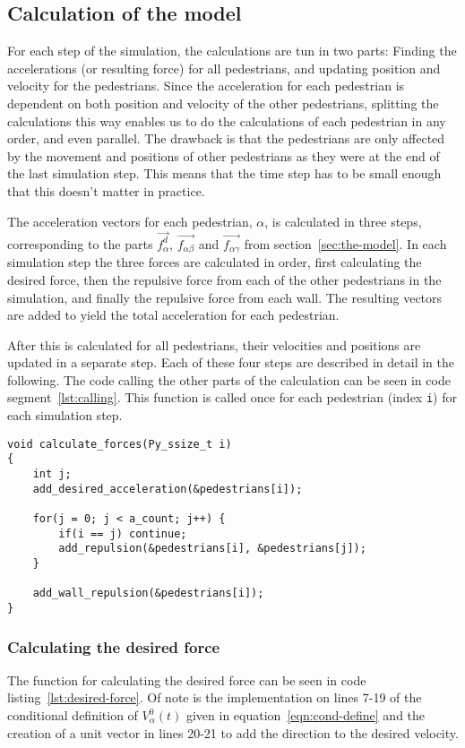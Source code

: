 \subsection{Calculation of the model}
\label{sec:model-calculation}
For each step of the simulation, the calculations are tun in two parts: 
Finding the accelerations (or resulting force) for all pedestrians, and updating 
position and velocity for the pedestrians.  Since the acceleration for each pedestrian 
is dependent on both position and velocity of the other pedestrians, splitting the 
calculations this way enables us to do the calculations of each pedestrian in any 
order, and even parallel. The drawback is that the pedestrians are only affected by 
the movement and positions of other pedestrians as they were at the end of the last 
simulation step. This means that the time step has to be small enough that 
this doesn't matter in practice.

The acceleration vectors for each pedestrian, $\alpha$, is calculated in three 
steps, corresponding to the parts $\overrightarrow{f_\alpha^d}$, 
$\overrightarrow{f_{\alpha \beta}}$ and $\overrightarrow{f_{\alpha \gamma}}$ from 
section~\ref{sec:the-model}. In each simulation step the three forces are 
calculated in order, first calculating the desired force, then the repulsive 
force from each of the other pedestrians in the simulation, and finally the 
repulsive force from each wall. The resulting vectors are added to yield the 
total acceleration for each pedestrian.

After this is calculated for all pedestrians, their velocities and positions are 
updated in a separate step. Each of these four steps are described in detail 
in the following. The code calling the other parts of the calculation can be 
seen in code segment~\ref{lst:calling}. This function is called once for each 
pedestrian (index \texttt{i}) for each simulation step.

\begin{lstlisting}[caption={Main function calling the other parts of the 
    calculation code.},label=lst:calling]
void calculate_forces(Py_ssize_t i)
{
    int j;
    add_desired_acceleration(&pedestrians[i]);

    for(j = 0; j < a_count; j++) {
        if(i == j) continue;
        add_repulsion(&pedestrians[i], &pedestrians[j]);
    }

    add_wall_repulsion(&pedestrians[i]);
}
\end{lstlisting}

\subsubsection{Calculating the desired force}
The function for calculating the desired force can be seen in code 
listing~\ref{lst:desired-force}. Of note is the implementation on lines 7-19 
of the conditional definition of $V_\alpha^0(t)$ given in 
equation~\eqref{eqn:cond-define} and the creation of a unit vector in lines 
20-21 to add the direction to the desired velocity.

